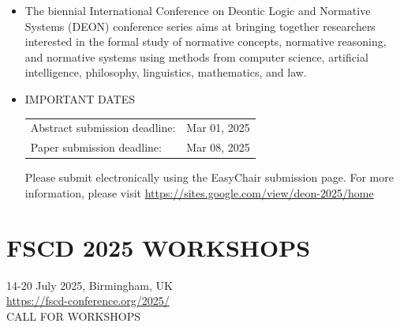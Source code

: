 \documentclass[prodmode,acmtecs]{acmsmall} %
\begin{document}
\begin{itemize}\item  The biennial International Conference on Deontic Logic and Normative Systems (DEON) conference series aims at bringing together researchers interested in the formal study of normative concepts, normative reasoning, and normative systems using methods from computer science, artificial intelligence, philosophy, linguistics, mathematics, and law. 
 
\item  IMPORTANT DATES 
 
\begin{tabulary}{\linewidth}{LL}Abstract submission deadline:  & Mar 01, 2025 \\
Paper submission deadline:  & Mar 08, 2025 \\
\end{tabulary}
 
  Please submit electronically using the EasyChair submission page. For more information, please visit \href{https://sites.google.com/view/deon-2025/home}{https://sites.google.com/view/deon-2025/home} 
 
\end{itemize}\section{FSCD 2025 WORKSHOPS}\label{FSCD2025WORKSHOPS}  14-20 July 2025, Birmingham, UK\\ 
  \href{https://fscd-conference.org/2025/}{https://fscd-conference.org/2025/}                       \\ 
CALL FOR WORKSHOPS 
\end{document}
